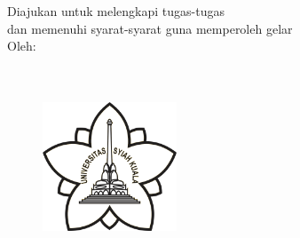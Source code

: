 %
%
%

\begin{titlepage}

    \begin{center}
        \vspace*{3em}
        {\fontsize{20}{20}
            \textbf{\Judul} \\[3em]
        }
        {\fontsize{16}{20}
            \textbf{\Type} \\[3em] 
        }
        {\fontsize{12}{20}
            {Diajukan untuk melengkapi tugas-tugas \\dan memenuhi syarat-syarat guna memperoleh gelar 
            \gelar} \\[3em]
        }
        {\fontsize{14}{20}
            {Oleh:} \\[3em]
        }
        {\fontsize{14}{20}
            \underline{\bo{\Penulis}} \\
            \bo{\npm} \\[3em]
        }
        
        \begin{figure}
            \begin{center}
                \includegraphics[width=4cm]{_internals/usk_logo.png}
            \end{center}
        \end{figure}    
        \vspace*{2em}
        
        \begin{center}
            {\fontsize{14}{20}
            }
        \end{center}
    \end{center}
\end{titlepage}